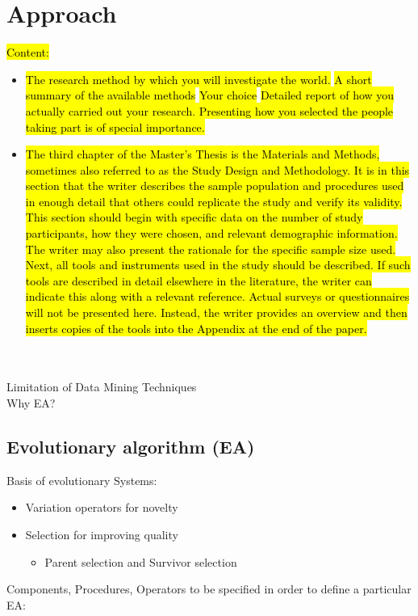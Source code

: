 \newpage
\section{Approach}
\hl{Content:}
\begin{itemize}
    \item \hl{The research method by which you will investigate the world. }
        \subitem \hl{A short summary of the available methods}
        \subitem \hl{Your choice}
        \subitem \hl{Detailed report of how you actually carried out your research. Presenting how you selected the people taking part is of special importance.}

    \item \hl{The third chapter of the Master's Thesis is the Materials and Methods, sometimes also referred to as the Study Design and Methodology. It is in this section that the writer describes the sample population and procedures used in enough detail that others could replicate the study and verify its validity. This section should begin with specific data on the number of study participants, how they were chosen, and relevant demographic information. The writer may also present the rationale for the specific sample size used. Next, all tools and instruments used in the study should be described. If such tools are described in detail elsewhere in the literature, the writer can indicate this along with a relevant reference. Actual surveys or questionnaires will not be presented here. Instead, the writer provides an overview and then inserts copies of the tools into the Appendix at the end of the paper. }
\end{itemize}
\\\\
Limitation of Data Mining Techniques\\
Why EA?\\

\subsection{Evolutionary algorithm (EA)}

Basis of evolutionary Systems:\cite{Eiben}
\begin{itemize}
    \item Variation operators for novelty
    \item Selection for improving quality
    \begin{itemize}
        \item Parent selection and Survivor selection
    \end{itemize}
\end{itemize}
Components, Procedures, Operators to be specified in order to define a particular EA:\cite{Eiben}

